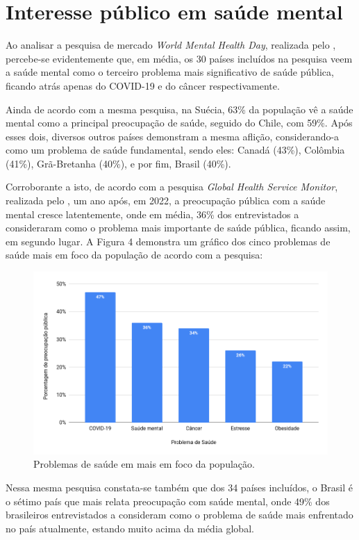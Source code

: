 \section{Interesse público em saúde mental}
\label{sec:interessePublico}

Ao analisar a pesquisa de mercado \textit{World Mental Health Day}, realizada pelo , percebe-se evidentemente que, em média, os 30 países incluídos na pesquisa veem a saúde mental como o terceiro problema mais significativo de saúde pública, ficando atrás apenas do COVID-19 e do câncer respectivamente.

Ainda de acordo com a mesma pesquisa, na Suécia, 63\% da população vê a saúde mental como a principal preocupação de saúde, seguido do Chile, com 59\%. Após esses dois, diversos outros países demonstram a mesma aflição, considerando-a como um problema de saúde fundamental, sendo eles: Canadá (43\%), Colômbia (41\%), Grã-Bretanha (40\%), e por fim, Brasil (40\%).

Corroborante a isto, de acordo com a pesquisa \textit{Global Health Service Monitor}, realizada pelo , um ano após, em 2022, a preocupação pública com a saúde mental cresce latentemente, onde em média, 36\% dos entrevistados a consideraram como o problema mais importante de saúde pública, ficando assim, em segundo lugar. A Figura 4 demonstra um gráfico dos cinco problemas de saúde mais em foco da população de acordo com a pesquisa:

\begin{figure}[H]
    \centering
    \caption{Problemas de saúde em mais em foco da população.}
    \label{fig:interessePublicoImg}
    \includegraphics[width=.8\textwidth]{data/figures/interesse-publico.png}
\end{figure}

Nessa mesma pesquisa constata-se também que dos 34 países incluídos, o Brasil é o sétimo país que mais relata preocupação com saúde mental, onde 49\% dos brasileiros entrevistados a consideram como o problema de saúde mais enfrentado no país atualmente, estando muito acima da média global.
